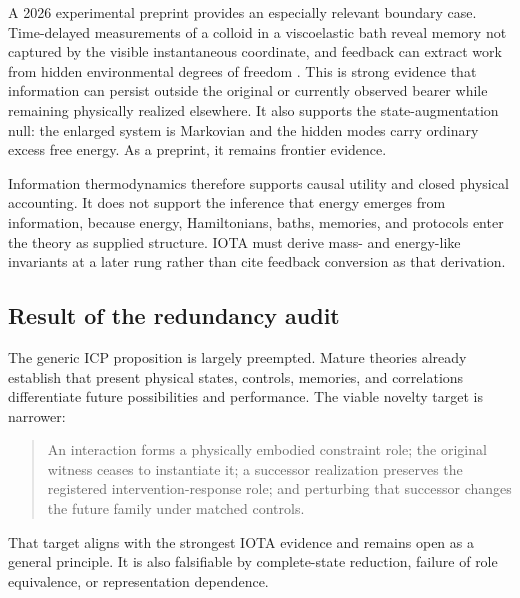A 2026 experimental preprint provides an especially relevant boundary case.
Time-delayed measurements of a colloid in a viscoelastic bath reveal memory not
captured by the visible instantaneous coordinate, and feedback can extract work
from hidden environmental degrees of freedom \citep{MurugaEtAl2026HiddenDegrees}.
This is strong evidence that information can persist outside the original or
currently observed bearer while remaining physically realized elsewhere. It
also supports the state-augmentation null: the enlarged system is Markovian and
the hidden modes carry ordinary excess free energy. As a preprint, it remains
frontier evidence.

Information thermodynamics therefore supports causal utility and closed
physical accounting. It does not support the inference that energy emerges from
information, because energy, Hamiltonians, baths, memories, and protocols enter
the theory as supplied structure. IOTA must derive mass- and energy-like
invariants at a later rung rather than cite feedback conversion as that
derivation.

\subsection{Result of the redundancy audit}

The generic ICP proposition is largely preempted. Mature theories already
establish that present physical states, controls, memories, and correlations
differentiate future possibilities and performance. The viable novelty target
is narrower:

\begin{quote}
An interaction forms a physically embodied constraint role; the original
witness ceases to instantiate it; a successor realization preserves the
registered intervention-response role; and perturbing that successor changes
the future family under matched controls.
\end{quote}

That target aligns with the strongest IOTA evidence and remains open as a
general principle. It is also falsifiable by complete-state reduction,
failure of role equivalence, or representation dependence.
